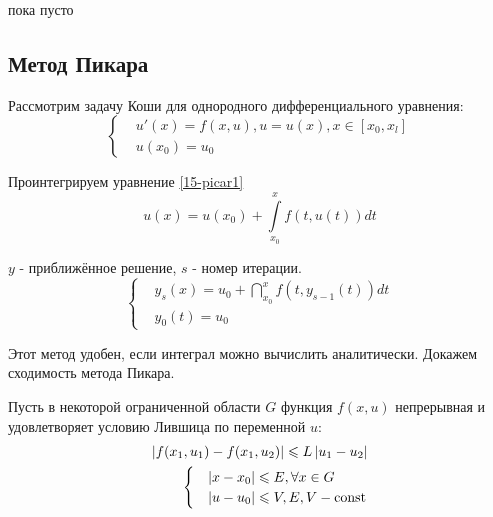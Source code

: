 \begin{col-answer-preambule}
	\begin{plan}
    \item пока пусто
	\end{plan}
\end{col-answer-preambule}


\subsection{Метод Пикара}

Рассмотрим задачу Коши для однородного дифференциального уравнения:
\begin{equation}
  \label{15-picar1}
  \begin{cases}
    &u'(x) = f(x, u), u = u(x), x \in [x_0, x_l]\\
    &u(x_0) = u_0
  \end{cases}
\end{equation}

Проинтегрируем  уравнение \eqref{15-picar1}
\begin{equation}
  \label{15-picar-integral}
  u(x) = u(x_0) + \int\limits_{x_0}^xf(t, u(t))dt
\end{equation}

$y$ - приближённое решение, $s$ - номер итерации.
\begin{equation}
  \label{15-picar-formula}
  \begin{cases}
    &y_s(x) = u_0 + \dint\limits_{x_0}^xf(t, y_{s - 1}(t))dt\\
    &y_0(t) = u_0
  \end{cases}
\end{equation}

Этот метод удобен, если интеграл можно вычислить аналитически. Докажем
сходимость метода Пикара.

Пусть в некоторой ограниченной области $G$ функция $f(x, u)$ непрерывная и
удовлетворяет условию Лившица по переменной $u$:
\begin{align}
  \left\lvert f(x_1, u_1) - f(x_1, u_2) \right\rvert \leqslant L\left\lvert u_1 - u_2 \right\rvert\\
  \label{15-limits}
  \begin{cases}
    &\left\lvert x - x_0 \right\rvert \leqslant E, \forall x \in G\\
    &\left\lvert u - u_0 \right\rvert \leqslant V, E, V - \operatorname{\text{const}}
  \end{cases}
\end{align}

